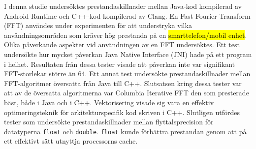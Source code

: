 I denna studie undersöktes prestandaskillnader mellan Java-kod kompilerad av Android Runtime och C++-kod kompilerad av Clang. En Fast Fourier Transform (FFT) användes under experimenten för att understryka vilka användningsområden som kräver hög prestanda på en \hl{smarttelefon/mobil enhet}. Olika påverkande aspekter vid användningen av en FFT undersöktes. Ett test undersökte hur mycket påverkan Java Native Interface (JNI) hade på ett program i helhet. Resultaten från dessa tester visade att påverkan inte var signifikant FFT-storlekar större än 64. Ett annat test undersökte prestandaskillnader mellan FFT-algoritmer översatta från Java till C++. Slutsatsen kring dessa tester var att av de översatta algoritmerna var Columbia Iterative FFT den som presterade bäst, både i Java och i C++. Vektorisering visade sig vara en effektiv optimeringsteknik för arkitekturspecifik kod skriven i C++. Slutligen utfördes tester som undersökte prestandaskillnader mellan flyttalsprecision för datatyperna \texttt{float} och \texttt{double}. \texttt{float} kunde förbättra prestandan genom att på ett effektivt sätt utnyttja processorns cache.
